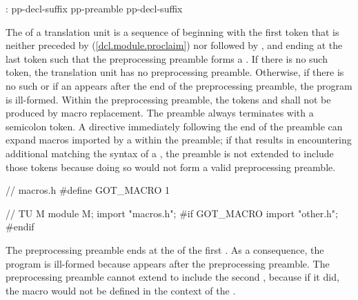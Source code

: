 \begin{after}\color{addclr}
\begin{std.txt}
\begin{bnf}
:\br
   pp-decl-suffix \terminal{;}\br
  pp-preamble \opt{}  pp-decl-suffix \terminal{;}
\end{bnf}

\alinea
The  of a translation unit is
a sequence of 
beginning with the first  token that is
neither preceded by  (\ref{dcl.module.proclaim})
nor followed by \tcode{;},
and ending at the last \tcode{;} token such that
the preprocessing preamble forms a .
If there is no such  token,
the translation unit has no preprocessing preamble.
Otherwise, if there is no such 
or if an  
appears after the end of the preprocessing preamble,
the program is ill-formed.
Within the preprocessing preamble, the tokens
 and 
shall not be produced by macro replacement.
\enternote
The preamble always terminates with a semicolon token.
A  directive immediately following the end of the preamble
can expand macros imported by a  within the
preamble; if that results in encountering additional
 matching the syntax of a
, the preamble is not extended to include
those tokens because doing so would not form a valid preprocessing preamble.
\begin{example}
\begin{codeblock}
// macros.h
#define GOT_MACRO 1

// TU M
module M;
import "macros.h";
#if GOT_MACRO
import "other.h";
#endif
\end{codeblock}
The preprocessing preamble ends at the \tcode{;} of the first .
As a consequence, the program is ill-formed because 
appears after the preprocessing preamble.
The preprocessing preamble cannot extend to include the second ,
because if it did, the macro  would not be defined in the
context of the .
\end{example}
\exitnote
\end{std.txt}

\end{after}
